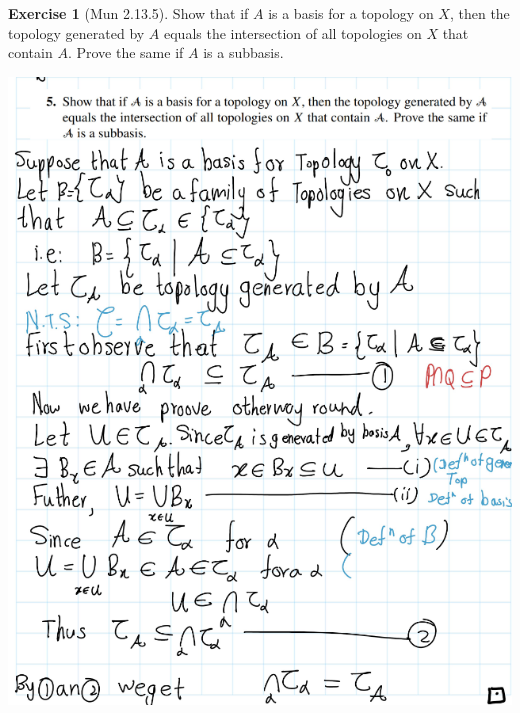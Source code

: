 \documentclass[
]{book}
\theoremstyle{definition}
\theoremstyle{definition}
\theoremstyle{definition}
\newtheorem{exercise}{Exercise}[chapter]
\theoremstyle{definition}
\theoremstyle{remark}
\begin{document}
\begin{exercise}[Mun 2.13.5]
\protect\hypertarget{exr:unnamed-chunk-105}{}\label{exr:unnamed-chunk-105}Show that if \(A\) is a basis for a topology on \(X\), then the topology generated by \(A\) equals the intersection of all topologies on \(X\) that contain \(A\). Prove the same if \(A\) is a subbasis.
\end{exercise}

\includegraphics{figures/Exercises/Ex 2.13/ex-5-1.png}
\end{document}
